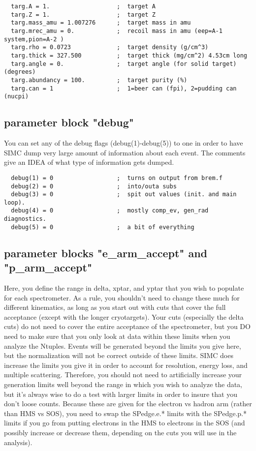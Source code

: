 \begin{verbatim}
  targ.A = 1.                   ;  target A
  targ.Z = 1.                   ;  target Z
  targ.mass_amu = 1.007276      ;  target mass in amu
  targ.mrec_amu = 0.            ;  recoil mass in amu (eep=A-1 system,pion=A-2 )
  targ.rho = 0.0723             ;  target density (g/cm^3)
  targ.thick = 327.500          ;  target thick (mg/cm^2) 4.53cm long
  targ.angle = 0.               ;  target angle (for solid target) (degrees)
  targ.abundancy = 100.         ;  target purity (%)
  targ.can = 1                  ;  1=beer can (fpi), 2=pudding can (nucpi)
\end{verbatim}



\subsection{parameter block "debug"}

You can set any of the debug flags (debug(1)-debug(5)) to one in order
to have SIMC dump very large amount of information about each event.
The comments give an IDEA of what type of information gets dumped.

\begin{verbatim}
  debug(1) = 0                  ;  turns on output from brem.f
  debug(2) = 0                  ;  into/outa subs
  debug(3) = 0                  ;  spit out values (init. and main loop).
  debug(4) = 0                  ;  mostly comp_ev, gen_rad diagnostics.
  debug(5) = 0                  ;  a bit of everything
\end{verbatim}



\subsection{parameter blocks "e\_arm\_accept" and "p\_arm\_accept"}

Here, you define the range in delta, xptar, and yptar that you wish to
populate for each spectrometer.  As a rule, you shouldn't need to change
these much for different kinematics, as long as you start out with cuts
that cover the full acceptance (except with the longer cryotargets).
Your cuts (especially the delta cuts) do not need to cover the entire
acceptance of the spectrometer, but you DO need to make sure that you
only look at data within these limits when you analyze the Ntuples.  Events
will be generated beyond the limits you give here, but the normalization will
not be correct outside of these limits.  SIMC does increase the limits you
give it in order to account for resolution, energy loss, and multiple
scattering.  Therefore, you should not need to artificially increase your
generation limits well beyond the range in which you wish to analyze the data,
but it's always wise to do a test with larger limits in order to insure that
you don't loose counts.  Because these are given for the electron vs hadron
arm (rather than HMS vs SOS), you need to swap the SPedge.e.* limits with
the SPedge.p.* limits if you go from putting electrons in the HMS to electrons
in the SOS (and possibly increase or decrease them, depending on the cuts
you will use in the analysis).

